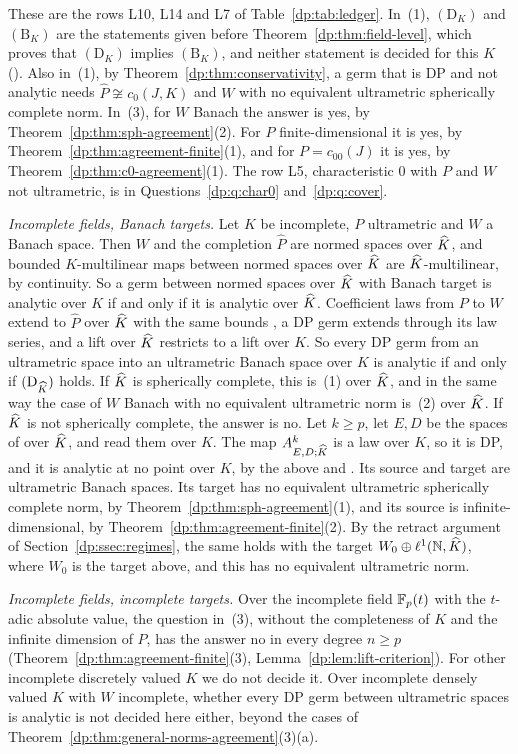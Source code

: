 These are the rows L10, L14 and L7 of Table~\ref{dp:tab:ledger}. In~(1), $(\mathrm D_K)$ and $(\mathrm B_K)$ are the statements given before Theorem~\ref{dp:thm:field-level}, which proves that $(\mathrm D_K)$ implies $(\mathrm B_K)$, and neither statement is decided for this $K$ (\cite[Section~12]{I}). Also in~(1), by Theorem~\ref{dp:thm:conservativity}, a germ that is DP and not analytic needs $\widehat P\not\cong c_0(J,K)$ and $W$ with no equivalent ultrametric spherically complete norm. In~(3), for $W$ Banach the answer is yes, by Theorem~\ref{dp:thm:sph-agreement}(2). For $P$ finite-dimensional it is yes, by Theorem~\ref{dp:thm:agreement-finite}(1), and for $P=c_{00}(J)$ it is yes, by Theorem~\ref{dp:thm:c0-agreement}(1). The row L5, characteristic $0$ with $P$ and $W$ not ultrametric, is in Questions~\ref{dp:q:char0} and~\ref{dp:q:cover}.

\emph{Incomplete fields, Banach targets.} Let $K$ be incomplete, $P$ ultrametric and $W$ a Banach space. Then $W$ and the completion $\widehat P$ are normed spaces over $\widehat K$, and bounded $K$-multilinear maps between normed spaces over $\widehat K$ are $\widehat K$-multilinear, by continuity. So a germ between normed spaces over $\widehat K$ with Banach target is analytic over $K$ if and only if it is analytic over $\widehat K$. Coefficient laws from $P$ to $W$ extend to $\widehat P$ over $\widehat K$ with the same bounds \cite[Lemma~Q.13(1),(2)]{I}, a DP germ extends through its law series, and a lift over $\widehat K$ restricts to a lift over $K$. So every DP germ from an ultrametric space into an ultrametric Banach space over $K$ is analytic if and only if $(\mathrm D_{\widehat K})$ holds. If $\widehat K$ is spherically complete, this is~(1) over $\widehat K$, and in the same way the case of $W$ Banach with no equivalent ultrametric norm is~(2) over $\widehat K$. If $\widehat K$ is not spherically complete, the answer is no. Let $k\ge p$, let $E,D$ be the spaces of \cite[Theorem~7.2(2)]{I} over $\widehat K$, and read them over $K$. The map $A^k_{E,D;\widehat K}$ is a law over $K$, so it is DP, and it is analytic at no point over $K$, by the above and \cite[Theorem~7.2(2)]{I}. Its source and target are ultrametric Banach spaces. Its target has no equivalent ultrametric spherically complete norm, by Theorem~\ref{dp:thm:sph-agreement}(1), and its source is infinite-dimensional, by Theorem~\ref{dp:thm:agreement-finite}(2). By the retract argument of Section~\ref{dp:ssec:regimes}, the same holds with the target $W_0\oplus\ell^1(\mathbb N,\widehat K)$, where $W_0$ is the target above, and this has no equivalent ultrametric norm.

\emph{Incomplete fields, incomplete targets.} Over the incomplete field $\mathbb F_p(t)$ with the $t$-adic absolute value, the question in~(3), without the completeness of $K$ and the infinite dimension of $P$, has the answer no in every degree $n\ge p$ (Theorem~\ref{dp:thm:agreement-finite}(3), Lemma~\ref{dp:lem:lift-criterion}). For other incomplete discretely valued $K$ we do not decide it. Over incomplete densely valued $K$ with $W$ incomplete, whether every DP germ between ultrametric spaces is analytic is not decided here either, beyond the cases of Theorem~\ref{dp:thm:general-norms-agreement}(3)(a).

